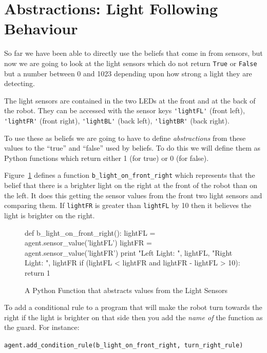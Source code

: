 \documentclass[a4,12pt]{article}
\begin{document}
\section{Abstractions:  Light Following Behaviour}

So far we have been able to directly use the beliefs that come in from sensors, but now we are going to look at the light sensors which do not return \lstinline{True} or \lstinline{False} but a number between 0 and 1023 depending upon how strong a light they are detecting.

The light sensors are contained in the two LEDs at the front and at the back of the robot.  They can be accessed with the sensor keys \lstinline{'lightFL'} (front left), \lstinline{'lightFR'} (front right), \lstinline{'lightBL'} (back left), \lstinline{'lightBR'} (back right).

To use these as beliefs we are going to have to define \emph{abstractions} from these values to the ``true'' and ``false'' used by beliefs.  To do this we will define them as Python functions which return either 1 (for true) or 0 (for false).

Figure~\ref{code:light} defines a function \lstinline{b_light_on_front_right} which represents that the belief that there is a brighter light on the right at the front of the robot than on the left.  It does this getting the sensor values from the front two light sensors and comparing them.  If \lstinline{lightFR} is greater than \lstinline{lightFL} by 10 then it believes the light is brighter on the right.

\begin{figure}[htbp]
\begin{pythonlisting}
def b_light_on_front_right():
	lightFL = agent.sensor_value('lightFL')
	lightFR = agent.sensor_value('lightFR')
	print "Left Light: ", lightFL, "Right Light: ", lightFR
	if (lightFL < lightFR and lightFR - lightFL > 10):
		return 1
\end{pythonlisting}
\caption{A Python Function that abstracts values from the Light Sensors}
\label{code:light}
\end{figure}

To add a conditional rule to a program that will make the robot turn towards the right if the light is brighter on that side then you add the \emph{name of} the function as the guard.  For instance:

\medskip

\lstinline{agent.add_condition_rule(b_light_on_front_right, turn_right_rule)}
\end{document}
